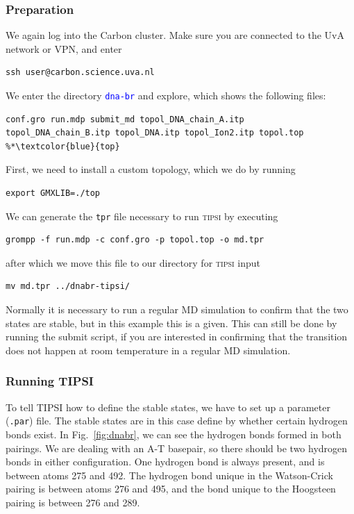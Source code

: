 \documentclass[]{article}
\begin{document}
\subsubsection*{Preparation}

We again log into the Carbon cluster. Make sure you are connected to the UvA network or VPN, and enter
%
\begin{lstlisting}
ssh user@carbon.science.uva.nl
\end{lstlisting}
%

We enter the directory \texttt{\textcolor{blue}{dna-br}} and explore, which shows the following files:
%
\begin{lstlisting}
conf.gro run.mdp submit_md topol_DNA_chain_A.itp 
topol_DNA_chain_B.itp topol_DNA.itp topol_Ion2.itp topol.top %*\textcolor{blue}{top}
\end{lstlisting}
%
First, we need to install a custom topology, which we do by running
%
\begin{lstlisting}
export GMXLIB=./top
\end{lstlisting}
%
We can generate the \texttt{tpr} file necessary to run \textsc{tipsi} by executing
%
\begin{lstlisting}
grompp -f run.mdp -c conf.gro -p topol.top -o md.tpr
\end{lstlisting}
%
after which we move this file to our directory for \textsc{tipsi} input
%
\begin{lstlisting}
mv md.tpr ../dnabr-tipsi/
\end{lstlisting}
%
Normally it is necessary to run a regular MD simulation to confirm that the two states are stable, but in this example this is a given. This can still be done by running the submit script, if you are interested in confirming that the transition does not happen at room temperature in a regular MD simulation.

\subsubsection*{Running TIPSI}

To tell \textsc{TIPSI} how to define the stable states, we have to set up a parameter (\texttt{.par}) file. The stable states are in this case define by whether certain hydrogen bonds exist. In Fig.~\ref{fig:dnabr}, we can see the hydrogen bonds formed in both pairings. We are dealing with an A-T basepair, so there should be two hydrogen bonds in either configuration. One hydrogen bond is always present, and is between atoms 275 and 492. The hydrogen bond unique in the Watson-Crick pairing is between atoms 276 and 495, and the bond unique to the Hoogsteen pairing is between 276 and 289.
\end{document}
